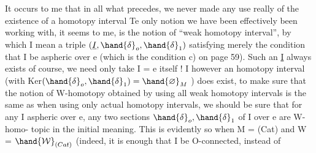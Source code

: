  It occurs to me that in all what precedes, we never made any use
really of the existence of a homotopy interval Te only notion we have
been effectively been working with, it seems to me, is the notion of
``weak homotopy interval'', by which I mean a triple $(\underline{I},\hand{\ensuremath{\delta}}_o,\hand{\ensuremath{\delta}}_1)$
satisfying merely the condition  that I be aspheric
over e (which is the condition c) on page 59). Such an \underline{I} always exists
of course, we need only take I = e itself ! I  however an  homotopy
interval (with Ker$(\hand{\ensuremath{\delta}}_o,\hand{\ensuremath{\delta}}_1) = \hand{\varnothing}_M$ ) does exist, to make sure that the notion
of W-homotopy obtained by using all weak homotopy intervals is the same
as when using only actual homotopy intervals, we should be sure that
for any I aspheric over e, any two sections $\hand{\ensuremath{\delta}}_o,\hand{\ensuremath{\delta}}_1$ of I over e are W-homo-%
topic in the initial meaning. This is evidently so when M = (Cat) and
W = $\hand{\ensuremath{\mathcal{W}}}_{(Cat)}$ (indeed, it is enough that I be O-connected, instead of

